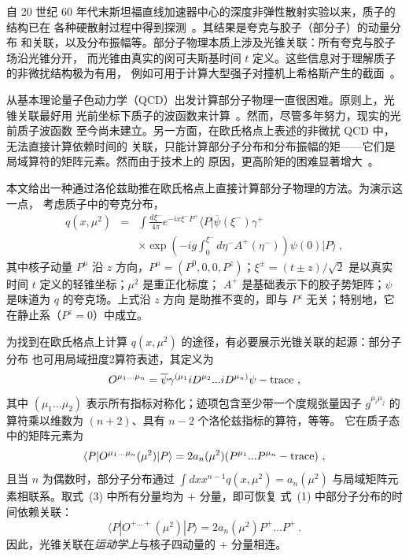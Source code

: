 
自 20 世纪 60 年代末斯坦福直线加速器中心的深度非弹性散射实验以来，质子的结构已在
各种硬散射过程中得到探测~\cite{Gao:2013xoa}。其结果是夸克与胶子（部分子）的动量分布
和关联，以及分布振幅等。部分子物理本质上涉及光锥关联：所有夸克与胶子场沿光锥分开，
而光锥由真实的闵可夫斯基时间 $t$ 定义。这些信息对于理解质子的非微扰结构极为有用，
例如可用于计算大型强子对撞机上希格斯产生的截面~\cite{science}。

从基本理论量子色动力学（QCD）出发计算部分子物理一直很困难。原则上，光锥关联最好用
光前坐标下质子的波函数来计算~\cite{brodsky}。然而，尽管多年努力，现实的光前质子波函数
至今尚未建立。另一方面，在欧氏格点上表述的非微扰 QCD 中，无法直接计算依赖时间的
关联，只能计算部分子分布和分布振幅的矩——它们是局域算符的矩阵元素。然而由于技术上的
原因，更高阶矩的困难显著增大~\cite{negele}。

本文给出一种通过洛伦兹助推在欧氏格点上直接计算部分子物理的方法。为演示这一点，
考虑质子中的夸克分布，
\begin{eqnarray}
   q(x, \mu^2) &=& \int \frac{d\xi^-}{4\pi} e^{-ix\xi^-P^+}  \langle P|\overline{\psi}(\xi^-)
   \gamma^+ \\
   && \times \exp\left(-ig\int^{\xi^-}_0 d\eta^- A^+(\eta^-) \right)\psi(0) |P\rangle \nonumber \ ,
\end{eqnarray}
其中核子动量 $P^\mu$ 沿 $z$ 方向，$P^\mu = (P^0, 0, 0, P^z)$；$\xi^\pm
=(t \pm z)/\sqrt{2}$ 是以真实时间 $t$ 定义的轻锥坐标；$\mu^2$ 是重正化标度；
$A^+$ 是基础表示下的胶子势矩阵；$\psi$ 是味道为 $q$ 的夸克场。上式沿 $z$ 方向
是助推不变的，即与 $P^z$ 无关；特别地，它在静止系（$P^z=0$）中成立。

为找到在欧氏格点上计算 $q(x,\mu^2)$ 的途径，有必要展示光锥关联的起源：部分子分布
也可用局域扭度2算符表述，其定义为
\begin{equation}
     O^{\mu_1...\mu_n}= {\overline \psi}\gamma^{(\mu_1}iD^{\mu_2} ... iD^{\mu_n)} \psi
                 - {\rm trace} \ ,
\end{equation}
其中 $(\mu_1...\mu_2)$ 表示所有指标对称化；迹项包含至少带一个度规张量因子
$g^{\mu_i \mu_j}$ 的算符乘以维数为 $(n+2)$、具有 $n-2$ 个洛伦兹指标的算符，等等。
它在质子态中的矩阵元素为
\begin{equation}
    \langle P|O^{\mu_1...\mu_n}(\mu^2)|P\rangle =
    2a_n(\mu^2) (P^{\mu_1} ... P^{\mu_n} - {\rm trace}) \ ,
\end{equation}
且当 $n$ 为偶数时，部分子分布通过 $\int dx x^{n-1} q(x, \mu^2)
= a_n(\mu^2)$ 与局域矩阵元素相联系。取式~(3) 中所有分量均为 $+$ 分量，即可恢复
式~(1) 中部分子分布的时间依赖关联：
\begin{equation}
   \langle P|O^{+...+}(\mu^2)|P\rangle =2 a_n(\mu^2) P^+...P^+ \ .
\end{equation}
因此，光锥关联在\textit{运动学上}与核子四动量的 $+$ 分量相连。

